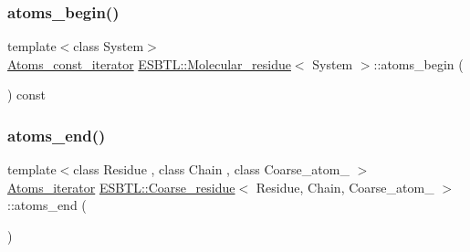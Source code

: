 \mbox{\label{group__grp__iters_ga1d1092e0acc1e4a6ee07b03a78af8e1c}} 
\subsubsection{\texorpdfstring{atoms\+\_\+begin()}{atoms\_begin()}\hspace{0.1cm}{\footnotesize\ttfamily [8/8]}}
{\footnotesize\ttfamily template$<$class System$>$ \\
\hyperlink{group__grp__iters_gab312d7a420670665b99a379b51825c9c}{Atoms\+\_\+const\+\_\+iterator} \hyperlink{classESBTL_1_1Molecular__residue}{E\+S\+B\+T\+L\+::\+Molecular\+\_\+residue}$<$ System $>$\+::atoms\+\_\+begin (\begin{DoxyParamCaption}{ }\end{DoxyParamCaption}) const\hspace{0.3cm}{\ttfamily [inline]}}

\mbox{\label{group__grp__iters_ga71c3a50b585303176a530b52265b1b9c}} 
\subsubsection{\texorpdfstring{atoms\+\_\+end()}{atoms\_end()}\hspace{0.1cm}{\footnotesize\ttfamily [1/8]}}
{\footnotesize\ttfamily template$<$class Residue , class Chain , class Coarse\+\_\+atom\+\_\+ $>$ \\
\hyperlink{group__grp__iters_ga8081408a6d91ed2a777111e2b2651ad4}{Atoms\+\_\+iterator} \hyperlink{classESBTL_1_1Coarse__residue}{E\+S\+B\+T\+L\+::\+Coarse\+\_\+residue}$<$ Residue, Chain, Coarse\+\_\+atom\+\_\+ $>$\+::atoms\+\_\+end (\begin{DoxyParamCaption}{ }\end{DoxyParamCaption})\hspace{0.3cm}{\ttfamily [inline]}}

\mbox{\label{group__grp__iters_gafa5493ec6a094421db2bfbaf17af3a90}} 
